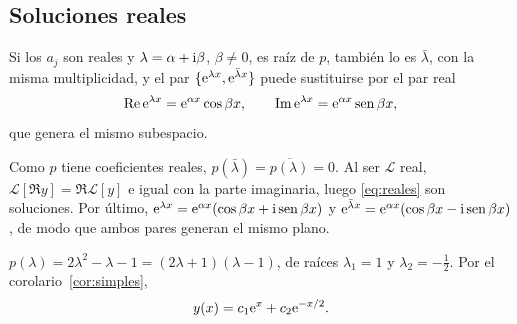 \documentclass[11pt,twoside]{article}
\newcommand\Lop{\mathcal L}
\begin{document}
\subsection{Soluciones reales}

\begin{proposicion}\label{prop:conjugadas}
Si los $a_j$ son reales y $\lambda=\alpha+\mathrm{i}\beta$, $\beta\neq0$, es raíz de $p$, también lo es $\bar\lambda$, con la misma
multiplicidad, y el par $\{\mathrm{e}^{\lambda x},\mathrm{e}^{\bar\lambda x}\}$ puede sustituirse por el par real
\begin{equation}\label{eq:reales}
\operatorname{Re}\mathrm{e}^{\lambda x}=\mathrm{e}^{\alpha x}\cos\beta x,\qquad\operatorname{Im}\mathrm{e}^{\lambda x}=\mathrm{e}^{\alpha x}\operatorname{sen}\beta x,
\end{equation}
que genera el mismo subespacio.
\end{proposicion}

\begin{demostracion}
Como $p$ tiene coeficientes reales, $p(\bar\lambda)=\overline{p(\lambda)}=0$. Al ser $\Lop$ real,
$\Lop[\Re y]=\Re\Lop[y]$ e igual con la parte imaginaria, luego \eqref{eq:reales} son soluciones. Por último,
$\mathrm{e}^{\lambda x}=\mathrm{e}^{\alpha x}(\cos\beta x+\mathrm{i}\operatorname{sen}\beta x)$ y $\mathrm{e}^{\bar\lambda x}=\allowbreak\mathrm{e}^{\alpha x}(\cos\beta x-\mathrm{i}\operatorname{sen}\beta x)$, de
modo que ambos pares generan el mismo plano.
\end{demostracion}

\begin{ejemplo}[$2y''-y'-y=0$]\label{ej:2y}
$p(\lambda)=2\lambda^2-\lambda-1=(2\lambda+1)(\lambda-1)$, de raíces $\lambda_1=1$ y $\lambda_2=-\frac12$. Por el
corolario~\ref{cor:simples},
\begin{equation}\label{eq:ej2y}
y(x)=c_1\mathrm{e}^{x}+c_2\mathrm{e}^{-x/2}.
\end{equation}
\end{ejemplo}
\end{document}
